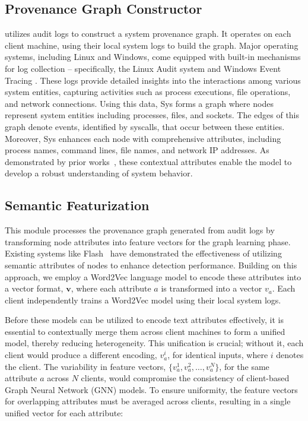 \subsection{Provenance Graph Constructor} 
\Sys utilizes audit logs to construct a system provenance graph. It operates on each client machine, using their local system logs to build the graph. Major operating systems, including Linux and Windows, come equipped with built-in mechanisms for log collection -- specifically, the Linux Audit system  and Windows Event Tracing . These logs provide detailed insights into the interactions among various system entities, capturing activities such as process executions, file operations, and network connections. Using this data, Sys forms a graph where nodes represent system entities including processes, files, and sockets. The edges of this graph denote events, identified by syscalls, that occur between these entities. Moreover, Sys enhances each node with comprehensive attributes, including process names, command lines, file names, and network IP addresses. As demonstrated by prior works~\cite{flash2024,cheng2023kairos}, these contextual attributes enable the model to develop a robust understanding of system behavior.

\subsection{Semantic Featurization}

This module processes the provenance graph generated from audit logs by transforming node attributes into feature vectors for the graph learning phase. Existing systems like Flash~\cite{flash2024} have demonstrated the effectiveness of utilizing semantic attributes of nodes to enhance detection performance. Building on this approach, we employ a Word2Vec language model to encode these attributes into a vector format, \(\mathbf{v}\), where each attribute \(a\) is transformed into a vector \(v_a\). Each client independently trains a Word2Vec model using their local system logs.

Before these models can be utilized to encode text attributes effectively, it is essential to contextually merge them across client machines to form a unified model, thereby reducing heterogeneity. This unification is crucial; without it, each client would produce a different encoding, \(v_a^i\), for identical inputs, where \(i\) denotes the client. The variability in feature vectors, \(\{v_a^1, v_a^2, \ldots, v_a^N\}\), for the same attribute \(a\) across \(N\) clients, would compromise the consistency of client-based Graph Neural Network (GNN) models. To ensure uniformity, the feature vectors for overlapping attributes must be averaged across clients, resulting in a single unified vector for each attribute:


